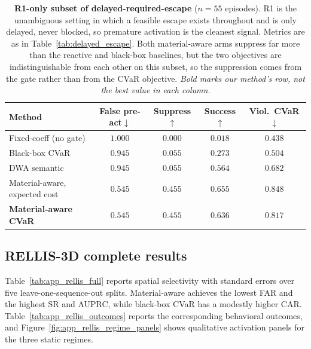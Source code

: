 \begin{table}[htbp]
\centering
\caption{\textbf{R1-only subset of delayed-required-escape} ($n{=}55$
episodes). R1 is the unambiguous setting in which a feasible escape exists
throughout and is only delayed, never blocked, so premature activation is the
cleanest signal. Metrics are as in Table~\ref{tab:delayed_escape}. Both
material-aware arms suppress far more than the reactive and black-box
baselines, but the two objectives are indistinguishable from each other on this
subset, so the suppression comes from the gate rather than from the CVaR objective.
\emph{Bold marks our method's row, not the best value in each column.}}
\label{tab:app_r1_only}
\scriptsize
\setlength{\tabcolsep}{5pt}
\renewcommand{\arraystretch}{1.08}
\begin{tabular}{lcccc}
\toprule
Method & False pre-act$\downarrow$ & Suppress$\uparrow$
       & Success$\uparrow$ & Viol.\ CVaR$\downarrow$ \\
\midrule
Fixed-coeff (no gate)  & $1.000$ & $0.000$ & $0.018$ & $0.438$ \\
Black-box CVaR         & $0.945$ & $0.055$ & $0.273$ & $0.504$ \\
DWA semantic           & $0.945$ & $0.055$ & $0.564$ & $0.682$ \\
Material-aware, expected cost
  & $0.545$ & $0.455$ & $0.655$ & $0.848$ \\
\textbf{Material-aware CVaR}
  & $\mathbf{0.545}$ & $\mathbf{0.455}$
  & $\mathbf{0.636}$ & $\mathbf{0.817}$ \\
\bottomrule
\end{tabular}
\end{table}

\subsection{RELLIS-3D complete results}
\label{app:rellis_full}

Table~\ref{tab:app_rellis_full} reports spatial selectivity with standard
errors over five leave-one-sequence-out splits. Material-aware achieves the
lowest FAR and the highest SR and AUPRC, while black-box CVaR has a modestly
higher CAR. Table~\ref{tab:app_rellis_outcomes} reports the corresponding
behavioral outcomes, and Figure~\ref{fig:app_rellis_regime_panels} shows
qualitative activation panels for the three static regimes.

